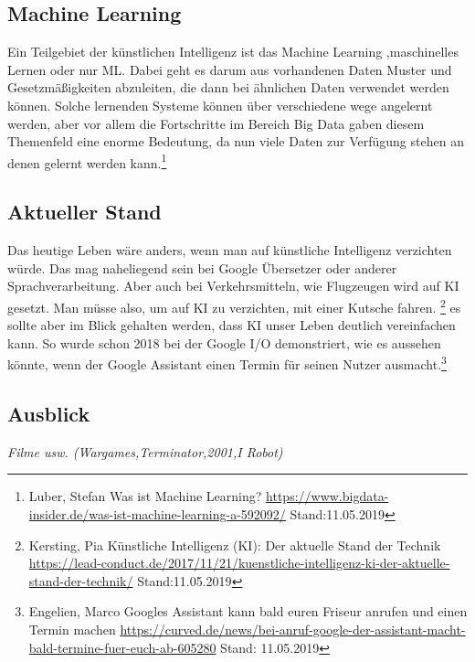 \documentclass[12pt,a4paper,ngerman]{article}
\begin{document}
	\subsection{Machine Learning}
	Ein Teilgebiet der künstlichen Intelligenz ist das Machine Learning ,maschinelles Lernen oder nur ML. Dabei geht es darum aus vorhandenen Daten Muster und Gesetzmäßigkeiten abzuleiten, die dann bei ähnlichen Daten verwendet werden können. Solche lernenden Systeme können über verschiedene wege angelernt werden, aber vor allem die Fortschritte im Bereich Big Data gaben diesem Themenfeld  eine enorme Bedeutung, da nun viele Daten zur Verfügung stehen an denen gelernt werden kann.\footnote{Luber, Stefan \glqq Was ist Machine Learning? \grqq{} \url{https://www.bigdata-insider.de/was-ist-machine-learning-a-592092/} Stand:11.05.2019}
	\subsection{Aktueller Stand}
	Das heutige Leben wäre anders, wenn man auf künstliche Intelligenz verzichten würde. Das mag naheliegend sein bei Google Übersetzer oder anderer Sprachverarbeitung. Aber auch bei Verkehrsmitteln, wie Flugzeugen wird auf KI gesetzt. Man müsse also, um auf KI zu verzichten, mit einer Kutsche fahren. \footnote{Kersting, Pia \glqq Künstliche Intelligenz (KI): Der aktuelle Stand der Technik \grqq{} \url{https://lead-conduct.de/2017/11/21/kuenstliche-intelligenz-ki-der-aktuelle-stand-der-technik/} Stand:11.05.2019}
	es sollte aber im Blick gehalten werden, dass KI unser Leben deutlich vereinfachen kann. So wurde schon 2018 bei der Google I/O demonstriert, wie es aussehen könnte, wenn der Google Assistant einen Termin für seinen Nutzer ausmacht.\footnote{Engelien, Marco \glqq Googles Assistant kann bald euren Friseur anrufen und einen Termin machen \grqq{} \url{https://curved.de/news/bei-anruf-google-der-assistant-macht-bald-termine-fuer-euch-ab-605280} Stand: 11.05.2019}
	\subsection{Ausblick}
	\textit{Filme usw. (Wargames,Terminator,2001,I Robot)}
	
\end{document}
